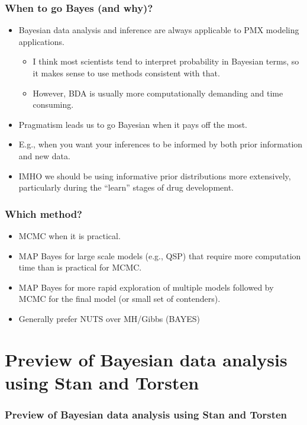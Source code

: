 \documentclass{beamer}
\begin{document}
\begin{frame}
  \frametitle{When to go Bayes (and why)?}
  
  \begin{itemize}
  \item Bayesian data analysis and inference are always applicable to
    PMX modeling applications. 
    \begin{itemize}
    \item I think most scientists tend to
    interpret probability in Bayesian terms, so it makes sense to use
    methods consistent with that. 
\item However, BDA is usually more
    computationally demanding and time consuming.
    \end{itemize}
  \item Pragmatism leads us to go Bayesian when it pays off the most.
  \item E.g., when you want your inferences to be informed by both prior
    information and new data.
  \item IMHO we should be using informative prior distributions more
    extensively, particularly during the “learn” stages of drug
    development.
  \end{itemize}

\end{frame}

\begin{frame}
  \frametitle{Which method?}
  
  \begin{itemize}
  \item MCMC when it is practical.
  \item MAP Bayes for large scale models (e.g., QSP) that require more
    computation time than is practical for MCMC.
  \item MAP Bayes for more rapid exploration of multiple models
    followed by MCMC for the final model (or small set of contenders).
  \item Generally prefer NUTS over MH/Gibbs (BAYES)
  \end{itemize}

\end{frame}

\section{Preview of Bayesian data analysis using Stan and Torsten}

\begin{frame}
  \frametitle{Preview of Bayesian data analysis using Stan and
    Torsten}
  

\end{frame}
\end{document}
